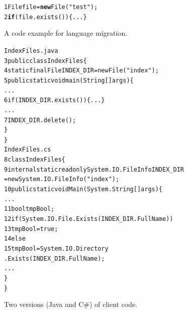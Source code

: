\begin{figure}[t]
\begin{CodeOut}
\begin{alltt}
1  File file = \textbf{new} File("test");
2    \textbf{if}(file.exists())\{...\}
\end{alltt}
\end{CodeOut}\vspace*{-4ex}
\caption{\label{fig:totranslation} A code example for language
migration.}%
\end{figure}
\begin{figure}[t]
\begin{CodeOut}\vspace*{-2ex}
\begin{alltt}
                  IndexFiles.java
3 public class IndexFiles \{
4   static final File INDEX_DIR = new File("index");
5   public static void main(String[] args) \{
      ...
6     if (INDEX_DIR.exists()) \{...\}
      ...
7       INDEX_DIR.delete();
    \}
  \}
                  IndexFiles.cs
8 class IndexFiles\{
9   internal static readonly System.IO.FileInfo INDEX_DIR
          = new System.IO.FileInfo("index");
10   public static void  Main(System.String[] args)\{
      ...
11     bool tmpBool;
12     if (System.IO.File.Exists(INDEX_DIR.FullName))
13       tmpBool = true;
14    else
15       tmpBool = System.IO.Directory
                         .Exists(INDEX_DIR.FullName);
      ...
    \}
 \}
\end{alltt}
\end{CodeOut}\vspace*{-4ex}
\caption{\label{fig:clientcode} Two versions (Java and C\#) of
client code.}\vspace*{-4ex}
\end{figure}



